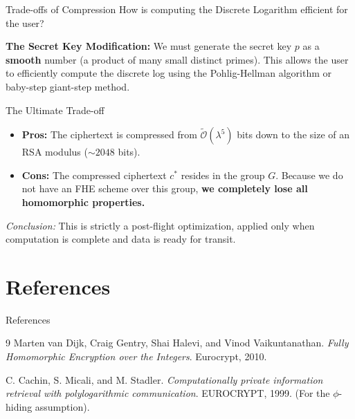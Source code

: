 \documentclass[10pt, aspectratio=169]{beamer}
\begin{document}
\begin{frame}{Trade-offs of Compression}
    How is computing the Discrete Logarithm efficient for the user?
    \pause
    
    \vspace{0.3cm}
    \textbf{The Secret Key Modification:}
    We must generate the secret key $p$ as a \textbf{smooth} number (a product of many small distinct primes). This allows the user to efficiently compute the discrete log using the Pohlig-Hellman algorithm or baby-step giant-step method.
    \pause
    
    \vspace{0.3cm}
    \begin{block}{The Ultimate Trade-off}
    \begin{itemize}
        \item \textbf{Pros:} The ciphertext is compressed from $\tilde{\mathcal{O}}(\lambda^5)$ bits down to the size of an RSA modulus ($\sim 2048$ bits).
        \item \textbf{Cons:} The compressed ciphertext $c^*$ resides in the group $G$. Because we do not have an FHE scheme over this group, \textbf{we completely lose all homomorphic properties.} 
    \end{itemize}
    \end{block}
    \pause
    
    \vspace{0.2cm}
    \textit{Conclusion:} This is strictly a post-flight optimization, applied only when computation is complete and data is ready for transit.
\end{frame}

\section{References}
\begin{frame}{References}
    \begin{thebibliography}{9}
        Marten van Dijk, Craig Gentry, Shai Halevi, and Vinod Vaikuntanathan.
        \textit{Fully Homomorphic Encryption over the Integers}. 
        Eurocrypt, 2010.
        
        C. Cachin, S. Micali, and M. Stadler.
        \textit{Computationally private information retrieval with polylogarithmic communication}.
        EUROCRYPT, 1999. (For the $\phi$-hiding assumption).
    \end{thebibliography}
\end{frame}
\end{document}
